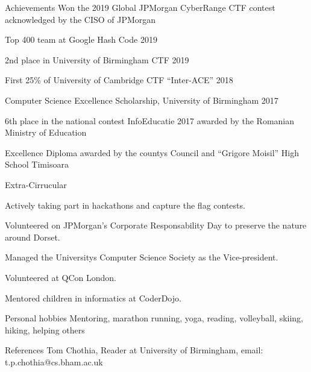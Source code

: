 \documentclass{resume} %
\newcommand{\quotes}[1]{``#1''}
\begin{document}
\begin{rSection}{Achievements} 
Won the 2019 Global JPMorgan CyberRange CTF contest acknowledged by the CISO of JPMorgan
\item Top 400 team at Google Hash Code 2019 
\item 2nd place in University of Birmingham CTF 2019
\item First 25\% of University of Cambridge CTF \quotes{Inter-ACE} 2018
\item Computer Science Excellence Scholarship, University of Birmingham 2017
\item 6th place in the national contest InfoEducatie 2017 awarded by the Romanian Ministry of Education
\item Excellence Diploma awarded by the county\textsc{}s Council and \quotes{Grigore Moisil} High School Timisoara \\
\end{rSection}


\begin{rSection}{Extra-Cirrucular} \itemsep -3pt
\item Actively taking part in hackathons and capture the flag contests.
\item Volunteered on JPMorgan's Corporate Responsability Day to preserve the nature around Dorset.
\item Managed the University\textsc{}s Computer Science Society as the Vice-president.
\item Volunteered at QCon London.
\item Mentored children in informatics at CoderDojo.\\

\end{rSection}

\begin{rSection}{Personal hobbies}
Mentoring, marathon running, yoga, reading, volleyball, skiing, hiking, helping others\\
\end{rSection}

\begin{rSection}{References}
Tom Chothia, Reader at University of Birmingham, email: t.p.chothia@cs.bham.ac.uk
\end{rSection}
\end{document}
